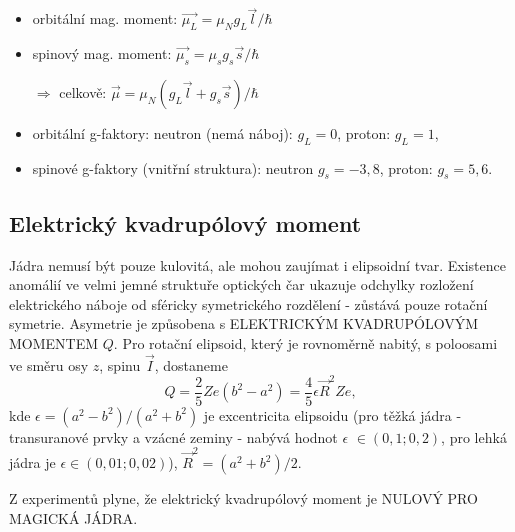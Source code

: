 \documentclass[../../main.tex]{subfiles}
\begin{document}
\begin{itemize}
	\item orbitální mag. moment: $\vec{\mu _L} = \mu_N g_L \vec{l} /\hbar $
	\item spinový mag. moment: $\vec{\mu _s} = \mu_s g_s \vec{s} /\hbar $
	
	$\Rightarrow$ celkově: $\vec{\mu} = \mu_N (g_L \vec{l} + g_s \vec{s}) / \hbar$
	
	\item orbitální g-faktory: neutron (nemá náboj): $g_L = 0$, proton: $g_L = 1$,
	\item spinové g-faktory (vnitřní struktura): neutron $g_s = -3,8$, proton: $g_s = 5,6$. 
\end{itemize}

\subsection{Elektrický kvadrupólový moment}

Jádra nemusí být pouze kulovitá, ale mohou zaujímat i elipsoidní tvar. Existence anomálií ve velmi jemné struktuře optických čar ukazuje odchylky rozložení elektrického náboje od sféricky symetrického rozdělení - zůstává pouze rotační symetrie. Asymetrie je způsobena s ELEKTRICKÝM KVADRUPÓLOVÝM MOMENTEM $Q$. Pro rotační elipsoid, který je rovnoměrně nabitý, s poloosami ve směru osy $z$, spinu $\vec{I}$, dostaneme 
\begin{equation}
Q = \dfrac{2}{5} Z e (b^2 - a^2) = \dfrac{4}{5} \epsilon \vec{R} ^2 Z e,
\end{equation}
kde $\epsilon = (a^2 - b^2)/(a^2 + b^2)$ je excentricita elipsoidu (pro těžká jádra - transuranové prvky a vzácné zeminy - nabývá hodnot $\epsilon$ $ \in (0,1; 0,2)$, pro lehká jádra je $\epsilon \in (0,01; 0,02)$), $\vec{R}^2 = (a^2 + b^2)/2$. 

Z experimentů plyne, že elektrický kvadrupólový moment je NULOVÝ PRO MAGICKÁ JÁDRA.
\end{document}
